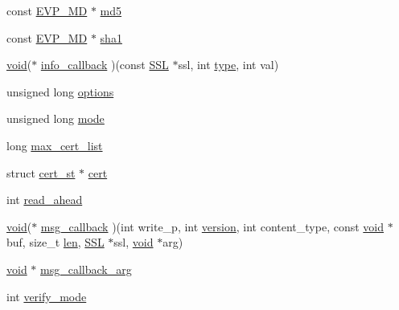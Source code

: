 \begin{DoxyCompactItemize}
\item 
const \hyperlink{crypto_2ossl__typ_8h_aac66cf010326fa9a927c2a34888f45d3}{E\+V\+P\+\_\+\+MD} $\ast$ \hyperlink{structssl__ctx__st_aa13149226ebb5fc47793360257077e62}{md5}
\item 
const \hyperlink{crypto_2ossl__typ_8h_aac66cf010326fa9a927c2a34888f45d3}{E\+V\+P\+\_\+\+MD} $\ast$ \hyperlink{structssl__ctx__st_a64ea1cb8e4b1be363a2ab9e7179a1cc5}{sha1}
\item 
\hyperlink{hw__4758__cca_8h_afad4d591c7931ff6dc5bf69c76c96aa0}{void}($\ast$ \hyperlink{structssl__ctx__st_a185f1e577fa5512b45a82a08e1b28805}{info\+\_\+callback} )(const \hyperlink{crypto_2ossl__typ_8h_a71f21e09bf365489dab9d85bd4785e24}{S\+SL} $\ast$ssl, int \hyperlink{include_2openssl_2x509_8h_ab512b8f495325c7ea0f5a5a5d3f938eb}{type}, int val)
\item 
unsigned long \hyperlink{structssl__ctx__st_aa6e0a0e8b728c3cc137ba2dfac41f277}{options}
\item 
unsigned long \hyperlink{structssl__ctx__st_ae78fbaec9753aee588d055aef59a801c}{mode}
\item 
long \hyperlink{structssl__ctx__st_aff3458de3fb94545236802c4042dc051}{max\+\_\+cert\+\_\+list}
\item 
struct \hyperlink{structcert__st}{cert\+\_\+st} $\ast$ \hyperlink{structssl__ctx__st_abeb15d9b044d05f1c6506ce64ff9f187}{cert}
\item 
int \hyperlink{structssl__ctx__st_abf961fa1992be2cb046dbf46e57a94ff}{read\+\_\+ahead}
\item 
\hyperlink{hw__4758__cca_8h_afad4d591c7931ff6dc5bf69c76c96aa0}{void}($\ast$ \hyperlink{structssl__ctx__st_a1c5cabae73050fccbea43d401aa910c0}{msg\+\_\+callback} )(int write\+\_\+p, int \hyperlink{s2n__config_8c_aa31f487a99743d24af9076a3e11e5425}{version}, int content\+\_\+type, const \hyperlink{hw__4758__cca_8h_afad4d591c7931ff6dc5bf69c76c96aa0}{void} $\ast$buf, size\+\_\+t \hyperlink{include_2openssl_2x509_8h_ad8c3db4434e9cb5cd772cc009f40e856}{len}, \hyperlink{crypto_2ossl__typ_8h_a71f21e09bf365489dab9d85bd4785e24}{S\+SL} $\ast$ssl, \hyperlink{hw__4758__cca_8h_afad4d591c7931ff6dc5bf69c76c96aa0}{void} $\ast$arg)
\item 
\hyperlink{hw__4758__cca_8h_afad4d591c7931ff6dc5bf69c76c96aa0}{void} $\ast$ \hyperlink{structssl__ctx__st_adef70196e5fffd3a53774362719a1e1c}{msg\+\_\+callback\+\_\+arg}
\item 
int \hyperlink{structssl__ctx__st_a96628f727de36322f51c8833ecd26668}{verify\+\_\+mode}
\item 

\end{DoxyCompactItemize}
